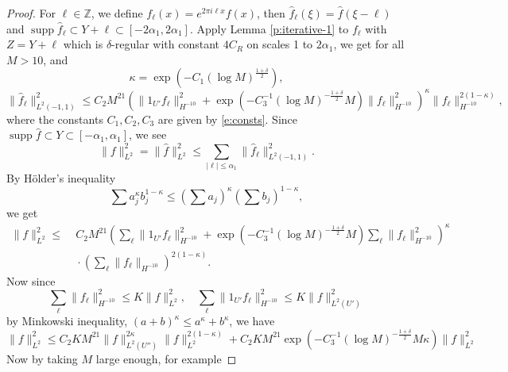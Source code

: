 \documentclass[reqno,12pt,letterpaper]{amsart}
\numberwithin{equation}{section}
\numberwithin{prop}{section}
\DeclareMathOperator{\supp}{supp}
\begin{document}
\begin{proof}
For $\ell\in\mathbb{Z}$, we define $f_\ell(x)=e^{2\pi i\ell x}f(x)$, then
$\widehat{f}_\ell(\xi)=\widehat{f}(\xi-\ell)$ and
$\supp\widehat{f}_\ell\subset Y+\ell\subset[-2\alpha_1,2\alpha_1]$. Apply Lemma \ref{p:iterative-1} to $f_\ell$ with $Z=Y+\ell$ which is $\delta$-regular with constant $4C_R$ on scales 1 to $2\alpha_1$, we get for all $M>10$,
and
\begin{equation*}
\kappa=\exp(-C_1(\log M)^{\frac{1+\delta}{2}}),
\end{equation*}
\begin{equation*}
\|\widehat{f}_\ell\|_{L^2(-1,1)}^2
\leq C_2M^{21}
\left(\|1_{U'}f_\ell\|_{H^{-10}}^2+\exp(-C_3^{-1}(\log M)^{-\frac{1+\delta}{2}}M)\|f_\ell\|_{H^{-10}}^2\right)^{\kappa}\|f_\ell\|_{H^{-10}}^{2(1-\kappa)},
\end{equation*}
where the constants $C_1,C_2,C_3$ are given by \eqref{e:consts}.
Since $\supp\widehat{f}\subset Y\subset[-\alpha_1,\alpha_1]$, we see
\begin{equation*}
\|f\|_{L^2}^2=\|\widehat{f}\|_{L^2}^2\leq\sum_{|\ell|\leq\alpha_1}\|\widehat{f}_\ell\|_{L^2(-1,1)}^2.
\end{equation*}
By H\"{o}lder's inequality
\begin{equation*}
\sum a_j^\kappa b_j^{1-\kappa}\leq\left(\sum a_j\right)^{\kappa}\left(\sum b_j\right)^{1-\kappa},
\end{equation*}
we get
\begin{equation*}
\begin{split}
\|f\|_{L^2}^2
\leq &\;C_2M^{21}
\left(\sum_\ell\|1_{U'}f_\ell\|_{H^{-10}}^2+\exp(-C_3^{-1}(\log M)^{-\frac{1+\delta}{2}}M)\sum_\ell\|f_\ell\|_{H^{-10}}^2\right)^{\kappa}\\
&\;\cdot\left(\sum_{\ell}\|f_\ell\|_{H^{-10}}\right)^{2(1-\kappa)}.
\end{split}
\end{equation*}
Now since
\begin{equation*}
\sum_{\ell}\|f_\ell\|_{H^{-10}}^2\leq K\|f\|_{L^2}^2,
\quad
\sum_{\ell}\|1_{U'}f_\ell\|_{H^{-10}}^2\leq K\|f\|_{L^2(U')}^2
\end{equation*}
by Minkowski inequality, $(a+b)^\kappa\leq a^\kappa+b^\kappa$, we have
\begin{equation*}
\|f\|_{L^2}^2
\leq C_2KM^{21}\|f\|_{L^2(U'')}^{2\kappa}\|f\|_{L^2}^{2(1-\kappa)}
+C_2KM^{21}\exp(-C_3^{-1}(\log M)^{-\frac{1+\delta}{2}}M\kappa)\|f\|_{L^2}^2
\end{equation*}
Now by taking $M$ large enough, for example

\end{proof}
\end{document}
